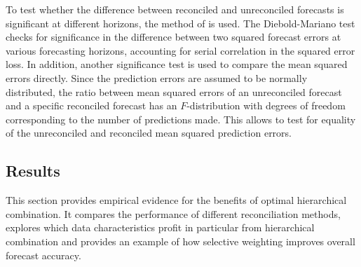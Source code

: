 \documentclass[a4paper,fleqn,11pt]{article}
\begin{document}
To test whether the difference between reconciled and unreconciled forecasts is significant at different horizons, the method of \cite{Diebold1995} is used. The Diebold-Mariano test checks for significance in the difference between two squared forecast errors at various forecasting horizons, accounting for serial correlation in the squared error loss. In addition, another significance test is used to compare the mean squared errors directly. Since the prediction errors are assumed to be normally distributed, the ratio between mean squared errors of an unreconciled forecast and a specific reconciled forecast has an $F$-distribution with degrees of freedom corresponding to the number of predictions made. This allows to test for equality of the unreconciled and reconciled mean squared prediction errors.\\


\subsection{Results}
This section provides empirical evidence for the benefits of optimal hierarchical combination. It compares the performance of different reconciliation methods, explores which data characteristics profit in particular from hierarchical combination and provides an example of how selective weighting improves overall forecast accuracy.\\
 
\end{document}

